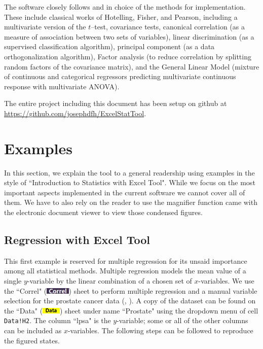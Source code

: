\documentclass[article]{jss}
\numberwithin{equation}{subsection}
\newcommand{\shtData}{``Data" (\includegraphics[height=8pt, keepaspectratio=true]{img/DataSheetTab_png}) }
\newcommand{\shtCorrel}{``Correl" (\includegraphics[height=8pt, keepaspectratio=true]{img/CorrelSheetTab_png}) }
\begin{document}
  
        The software closely follows \cite{anderson2003introMVA3e} and \cite{johnson1992applied} in choice of the methods for implementation. These include classical works of Hotelling, Fisher, and Pearson, including a multivariate version of the  $t$--test, covariance tests, canonical correlation (as a measure of association between two sets of variables), linear discrimination (as a supervised classification algorithm),  principal component (as a data orthogonalization algorithm), Factor analysis (to reduce correlation by splitting random factors of the covariance matrix), and the General Linear Model (mixture of continuous and categorical regressors predicting multivariate continuous response with multivariate ANOVA).
        
        The entire project including this document has been setup on github at \url{https://github.com/josephdfh/ExcelStatTool}.
  
  
        \section[example]{Examples}        
            In this section, we explain the tool to a general readership using examples in the style of ``Introduction to Statistics with Excel Tool". While we focus on the most important aspects implemented in the current software we cannot cover all of them. We have to also rely on the reader to use the magnifier function came with the electronic document viewer to view those condensed figures.
                
        \subsection[egReg]{Regression with Excel Tool}
        This first example is reserved for multiple regression for its unsaid importance among all statistical methods. 
        Multiple regression models the mean value of a single $y$-variable by the linear combination of a chosen set of $x$-variables. 
        We use the \shtCorrel sheet to perform multiple regression and a manual variable selection for the prostate cancer data (\cite{stamey1989prostate}, \cite{RpackageElemStatLearn}). 
        A copy of the dataset can be found on the \shtData sheet under name ``Prostate" using the dropdown menu of cell \texttt{Data!H2}. 
        The column ``lpsa" is the $y$-variable; some or all of the other columns can be included as $x$-variables.
	    The following steps can be followed to reproduce the figured states.
	    
\end{document}
